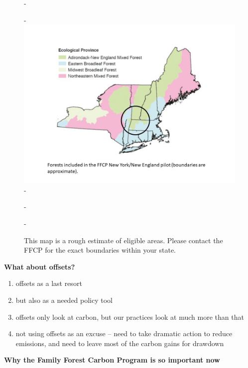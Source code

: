 \documentclass{article}\usepackage[]{graphicx}\usepackage[]{color}
\begin{document}
{\begin{figure} [H]
  -\begin{center}
  -\includegraphics[width=14cm]{..//figures/map_for_ffcp.jpg}\label{fig:map}
  -\caption{This map is a rough estimate of eligible areas. Please contact the FFCP for the exact boundaries within your state.}
  -\end{center}
  -\end{figure}}
  
{\Large{\textbf{What about offsets?}}}
\begin{enumerate}
  \item offsets as a last resort
  \item but also as a needed policy tool
  \item offsets only look at carbon, but our practices look at much more than that
  \item not using offsets as an excuse -- need to take dramatic action to reduce emissions, and need to leave most of the carbon gains for drawdown
\end{enumerate}



{\Large{\textbf{Why the Family Forest Carbon Program is so important now}}}
\end{document}
